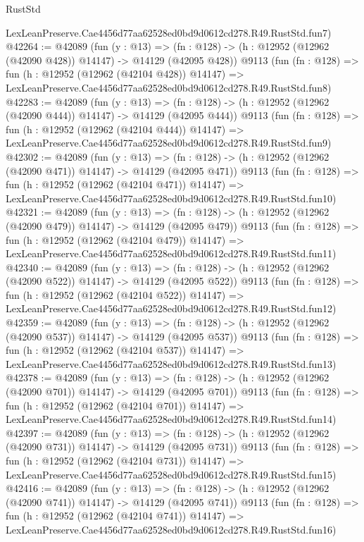 \begin{lexlean}{RustStd}
\begin{coremodule}
    LexLeanPreserve.Cae4456d77aa62528ed0bd9d0612cd278.R49.RustStd.fun7)
@42264 := @42089
    (fun (y : @13) =>
    (fn : @128) -> (h : @12952 (@12962 (@42090 @428)) @14147) -> @14129 (@42095 @428))
    @9113
    (fun (fn : @128) =>
    fun (h : @12952 (@12962 (@42104 @428)) @14147) =>
    LexLeanPreserve.Cae4456d77aa62528ed0bd9d0612cd278.R49.RustStd.fun8)
@42283 := @42089
    (fun (y : @13) =>
    (fn : @128) -> (h : @12952 (@12962 (@42090 @444)) @14147) -> @14129 (@42095 @444))
    @9113
    (fun (fn : @128) =>
    fun (h : @12952 (@12962 (@42104 @444)) @14147) =>
    LexLeanPreserve.Cae4456d77aa62528ed0bd9d0612cd278.R49.RustStd.fun9)
@42302 := @42089
    (fun (y : @13) =>
    (fn : @128) -> (h : @12952 (@12962 (@42090 @471)) @14147) -> @14129 (@42095 @471))
    @9113
    (fun (fn : @128) =>
    fun (h : @12952 (@12962 (@42104 @471)) @14147) =>
    LexLeanPreserve.Cae4456d77aa62528ed0bd9d0612cd278.R49.RustStd.fun10)
@42321 := @42089
    (fun (y : @13) =>
    (fn : @128) -> (h : @12952 (@12962 (@42090 @479)) @14147) -> @14129 (@42095 @479))
    @9113
    (fun (fn : @128) =>
    fun (h : @12952 (@12962 (@42104 @479)) @14147) =>
    LexLeanPreserve.Cae4456d77aa62528ed0bd9d0612cd278.R49.RustStd.fun11)
@42340 := @42089
    (fun (y : @13) =>
    (fn : @128) -> (h : @12952 (@12962 (@42090 @522)) @14147) -> @14129 (@42095 @522))
    @9113
    (fun (fn : @128) =>
    fun (h : @12952 (@12962 (@42104 @522)) @14147) =>
    LexLeanPreserve.Cae4456d77aa62528ed0bd9d0612cd278.R49.RustStd.fun12)
@42359 := @42089
    (fun (y : @13) =>
    (fn : @128) -> (h : @12952 (@12962 (@42090 @537)) @14147) -> @14129 (@42095 @537))
    @9113
    (fun (fn : @128) =>
    fun (h : @12952 (@12962 (@42104 @537)) @14147) =>
    LexLeanPreserve.Cae4456d77aa62528ed0bd9d0612cd278.R49.RustStd.fun13)
@42378 := @42089
    (fun (y : @13) =>
    (fn : @128) -> (h : @12952 (@12962 (@42090 @701)) @14147) -> @14129 (@42095 @701))
    @9113
    (fun (fn : @128) =>
    fun (h : @12952 (@12962 (@42104 @701)) @14147) =>
    LexLeanPreserve.Cae4456d77aa62528ed0bd9d0612cd278.R49.RustStd.fun14)
@42397 := @42089
    (fun (y : @13) =>
    (fn : @128) -> (h : @12952 (@12962 (@42090 @731)) @14147) -> @14129 (@42095 @731))
    @9113
    (fun (fn : @128) =>
    fun (h : @12952 (@12962 (@42104 @731)) @14147) =>
    LexLeanPreserve.Cae4456d77aa62528ed0bd9d0612cd278.R49.RustStd.fun15)
@42416 := @42089
    (fun (y : @13) =>
    (fn : @128) -> (h : @12952 (@12962 (@42090 @741)) @14147) -> @14129 (@42095 @741))
    @9113
    (fun (fn : @128) =>
    fun (h : @12952 (@12962 (@42104 @741)) @14147) =>
    LexLeanPreserve.Cae4456d77aa62528ed0bd9d0612cd278.R49.RustStd.fun16)

\end{coremodule}
\end{lexlean}
